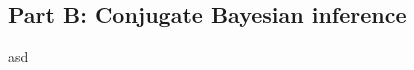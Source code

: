 \documentclass{article}
\begin{document}
\subsection{Part B: Conjugate Bayesian inference}
asd

\clearpage

\printbibliography
\end{document}
